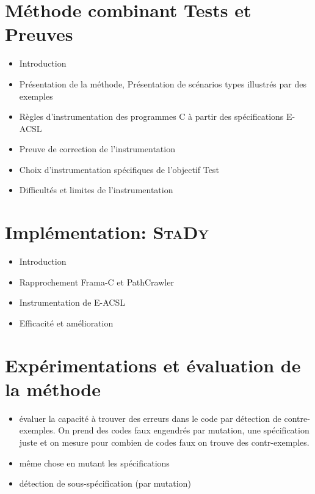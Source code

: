 
\chapter{Méthode combinant Tests et Preuves}

\begin{itemize}
\item Introduction
\item Présentation de la méthode,
  Présentation de scénarios types illustrés par des exemples
\item Règles d'instrumentation des programmes C à partir des spécifications
  E-ACSL
\item Preuve de correction de l'instrumentation
\item Choix d'instrumentation spécifiques de l'objectif Test
\item Difficultés et limites de l'instrumentation
\end{itemize}

\chapter{Implémentation: \textsc{StaDy}}

\begin{itemize}
\item Introduction
\item Rapprochement Frama-C et PathCrawler
\item Instrumentation de E-ACSL
\item Efficacité et amélioration
\end{itemize}

\chapter{Expérimentations et évaluation de la méthode}

\begin{itemize}
\item évaluer la capacité à trouver des erreurs dans le code par détection de
  contre-exemples. On prend des codes faux engendrés par mutation, une
  spécification juste et on mesure pour combien de codes faux on trouve des
  contr-exemples.
\item même chose en mutant les spécifications
\item détection de sous-spécification (par mutation)
\end{itemize}
